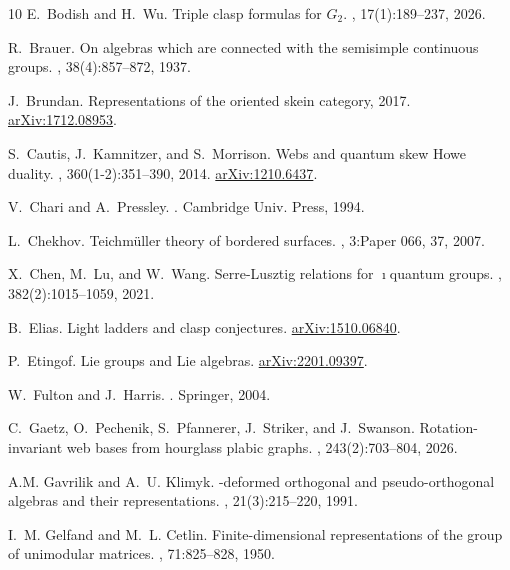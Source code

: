 \documentclass[10pt]{amsart}
\numberwithin{equation}{section}
\newcommand{\arxiv}[1]{\href{https://arxiv.org/abs/#1}{\small  arXiv:#1}}
\theoremstyle{definition}
\begin{document}
\begin{thebibliography}{10}
E.~Bodish and H.~Wu.
\newblock Triple clasp formulas for {$G_2$}.
, 17(1):189--237, 2026.

R.~Brauer.
\newblock On algebras which are connected with the semisimple continuous
  groups.
, 38(4):857--872, 1937.

J.~Brundan.
\newblock Representations of the oriented skein category, 2017.
\newblock \arxiv{1712.08953}.

S.~Cautis, J.~Kamnitzer, and S.~Morrison.
\newblock Webs and quantum skew {H}owe duality.
, 360(1-2):351--390, 2014.
\newblock \href{http://arxiv.org/abs/1210.6437}{arXiv:1210.6437}.

V.~Chari and A.~Pressley.
.
\newblock Cambridge Univ. Press, 1994.

L.~Chekhov.
\newblock Teichm\"uller theory of bordered surfaces.
, 3:Paper 066,
  37, 2007.

X.~Chen, M.~Lu, and W.~Wang.
\newblock Serre-{L}usztig relations for {$\imath$}quantum groups.
, 382(2):1015--1059, 2021.

B.~Elias.
\newblock Light ladders and clasp conjectures.
\newblock \arxiv{1510.06840}.

P.~Etingof.
\newblock Lie groups and {L}ie algebras.
\newblock \arxiv{2201.09397}.

W.~Fulton and J.~Harris.
.
\newblock Springer, 2004.

C.~Gaetz, O.~Pechenik, S.~Pfannerer, J.~Striker, and J.~Swanson.
\newblock Rotation-invariant web bases from hourglass plabic graphs.
, 243(2):703--804, 2026.

A.M. Gavrilik and A.~U. Klimyk.
-deformed orthogonal and pseudo-orthogonal algebras and their
  representations.
, 21(3):215--220, 1991.

I.~M. Gelfand and M.~L. Cetlin.
\newblock Finite-dimensional representations of the group of unimodular
  matrices.
, 71:825--828, 1950.


\end{thebibliography}
\end{document}
